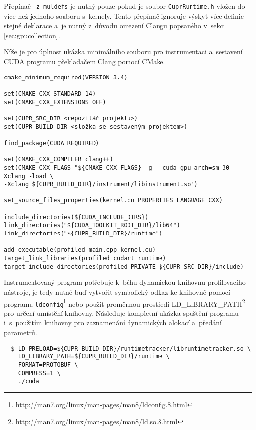 \vspace{5mm}
Přepínač \texttt{-z\ muldefs} je nutný pouze pokud je soubor \texttt{CuprRuntime.h} vložen do více než jednoho souboru s~kernely. Tento přepínač ignoruje výskyt více definic stejné deklarace a~je nutný z~důvodu omezení Clangu popsaného v~sekci \ref{sec:gpucollection}.

Níže je pro úplnost ukázka minimálního souboru pro instrumentaci a~sestavení CUDA programu překladačem Clang pomocí CMake.


\begin{verbatim}
cmake_minimum_required(VERSION 3.4)

set(CMAKE_CXX_STANDARD 14)
set(CMAKE_CXX_EXTENSIONS OFF)

set(CUPR_SRC_DIR <repozitář projektu>)
set(CUPR_BUILD_DIR <složka se sestaveným projektem>)

find_package(CUDA REQUIRED)

set(CMAKE_CXX_COMPILER clang++)
set(CMAKE_CXX_FLAGS "${CMAKE_CXX_FLAGS} -g --cuda-gpu-arch=sm_30 -Xclang -load \
-Xclang ${CUPR_BUILD_DIR}/instrument/libinstrument.so")

set_source_files_properties(kernel.cu PROPERTIES LANGUAGE CXX)

include_directories(${CUDA_INCLUDE_DIRS})
link_directories("${CUDA_TOOLKIT_ROOT_DIR}/lib64")
link_directories("${CUPR_BUILD_DIR}/runtime")

add_executable(profiled main.cpp kernel.cu)
target_link_libraries(profiled cudart runtime)
target_include_directories(profiled PRIVATE ${CUPR_SRC_DIR}/include)
\end{verbatim}


Instrumentovaný program potřebuje k~běhu dynamickou knihovnu profilovacího nástroje, je tedy nutné buď vytvořit symbolický odkaz ke knihovně pomocí programu \texttt{ldconfig}\footnote{\url{http://man7.org/linux/man-pages/man8/ldconfig.8.html}} nebo použít proměnnou prostředí LD\_LIBRARY\_PATH\footnote{\url{http://man7.org/linux/man-pages/man8/ld.so.8.html}} pro určení umístění knihovny. Následuje kompletní ukázka spuštění programu i~s~použitím knihovny pro zaznamenání dynamických alokací a~předání parametrů.

\begin{verbatim}
  $ LD_PRELOAD=${CUPR_BUILD_DIR}/runtimetracker/libruntimetracker.so \
    LD_LIBRARY_PATH=${CUPR_BUILD_DIR}/runtime \
    FORMAT=PROTOBUF \
    COMPRESS=1 \
    ./cuda
\end{verbatim}

